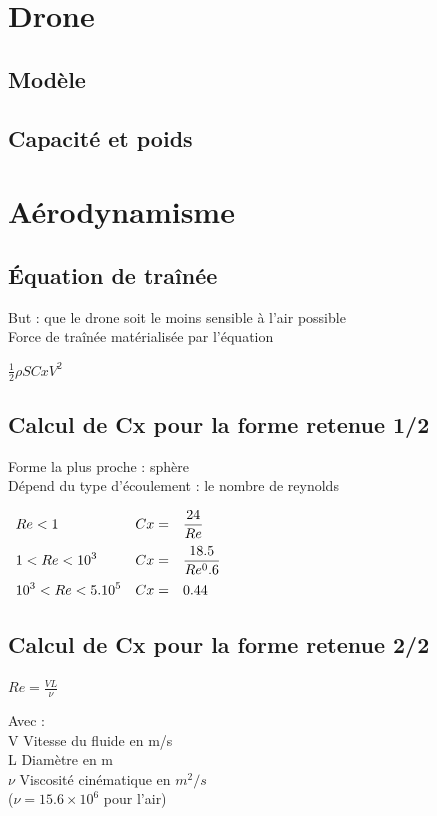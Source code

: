 \documentclass{beamer}
\begin{document}
\section{Drone}

\subsection{Modèle}
\subsection{Capacité et poids}

\section{Aérodynamisme}

\subsection{Équation de traînée}
\begin{frame}
 But : que le drone soit le moins sensible à l'air possible \\
 Force de traînée matérialisée par l'équation \\
 \begin{center}
  $\displaystyle{\frac12 \rho S Cx V^2}$
 \end{center}
\end{frame}

\subsection{Calcul de Cx pour la forme retenue 1/2}
\begin{frame}
 Forme la plus proche : sphère \\
 Dépend du type d'écoulement : le nombre de reynolds \\
 \begin{center}
  $\begin{array}{>{\displaystyle}l>{\displaystyle}l>{\displaystyle}l}
   Re < 1 & Cx = & \frac{24}{Re} \medbreak \\
   1 < Re < 10^3 & Cx = & \frac{18.5}{Re^0.6} \medbreak \\
   10^3 < Re < 5.10^5 & Cx = & 0.44
  \end{array}$
 \end{center}
\end{frame}

\subsection{Calcul de Cx pour la forme retenue 2/2}
\begin{frame}
 \begin{center}
  $\displaystyle{Re = \frac{VL}{\nu}}$
 \end{center}
 Avec : \\
 V Vitesse du fluide en m/s \\
 L Diamètre en m \\
 $\nu$ Viscosité cinématique en $m^2/s$ \\
 ($\nu = 15.6 \times 10^6$ pour l'air)
\end{frame}
\end{document}
